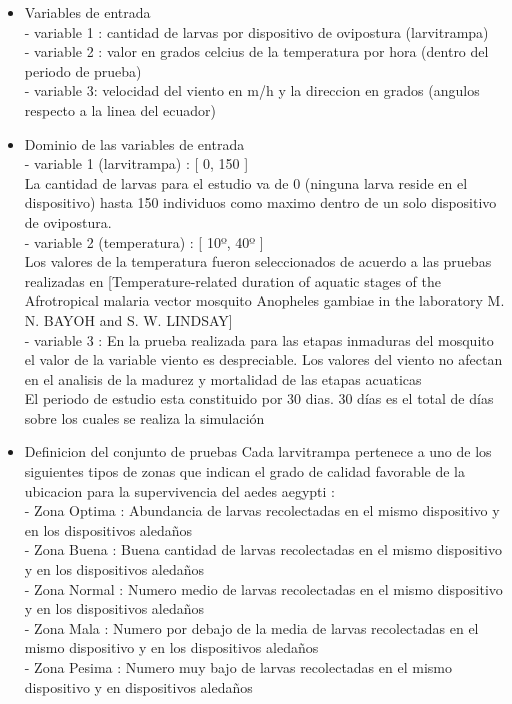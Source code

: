 \begin{itemize}
\item Variables de entrada \\
- variable 1 : cantidad de larvas por dispositivo de ovipostura (larvitrampa) \\
- variable 2 : valor en grados celcius de la temperatura por hora (dentro del periodo de prueba)\\
- variable 3: velocidad del viento en m/h y la direccion en grados (angulos respecto
a la linea del ecuador)\\

\item Dominio de las variables de entrada\\
- variable 1 (larvitrampa) : [ 0, 150 ]\\
La cantidad de larvas para el estudio va de 0 (ninguna larva reside en el 
dispositivo) hasta 150 individuos como maximo dentro de un solo dispositivo
de ovipostura.\\

- variable 2 (temperatura) :  [ 10º, 40º ]\\
Los valores de la temperatura fueron seleccionados de acuerdo a las pruebas realizadas en
[Temperature-related duration of aquatic stages of the Afrotropical 
malaria vector mosquito Anopheles gambiae in the laboratory M. N. BAYOH 
and S. W. LINDSAY]\\

- variable 3 : En la prueba realizada para las etapas inmaduras del 
mosquito el valor de la variable viento es despreciable. Los valores 
del viento no afectan en el analisis de la madurez y mortalidad 
de las etapas acuaticas\\

El periodo de estudio esta constituido por 30 dias. 30 días es el total
de días sobre los cuales se realiza la simulación \\

\item Definicion del conjunto de pruebas
Cada larvitrampa pertenece a uno de los siguientes tipos de zonas que 
indican el grado de calidad favorable de la ubicacion para la supervivencia
del aedes aegypti :\\

- Zona Optima : Abundancia de larvas recolectadas en el mismo dispositivo
y en los dispositivos aledaños \\
- Zona Buena : Buena cantidad de larvas recolectadas en el mismo dispositivo
y en los dispositivos aledaños \\
- Zona Normal : Numero medio de larvas recolectadas en el mismo dispositivo
y en los dispositivos aledaños \\
- Zona Mala : Numero por debajo de la media de larvas recolectadas en 
el mismo dispositivo y en los dispositivos aledaños \\
- Zona Pesima : Numero muy bajo de larvas recolectadas en el mismo dispositivo
y en dispositivos aledaños \\



\end{itemize}
